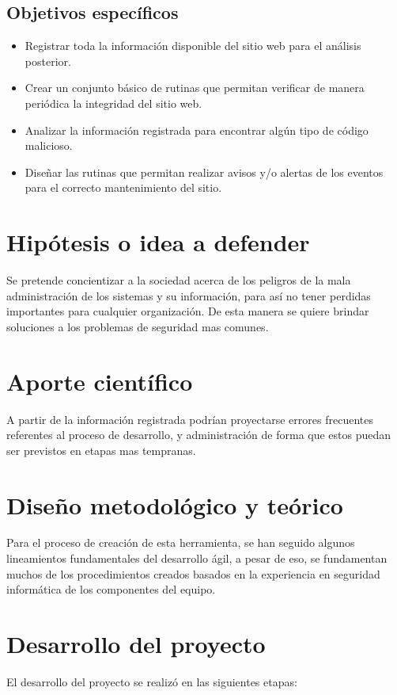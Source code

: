 \documentclass[letter,twoside,11pt]{article}
\begin{document}
\subsection{Objetivos específicos}
\begin{itemize}
\item Registrar toda la información disponible del sitio web para el análisis
    posterior.
\item Crear un conjunto básico de rutinas que permitan verificar de manera
    periódica la integridad del sitio web.
\item Analizar la información registrada para encontrar algún tipo de código
    malicioso.
\item Diseñar las rutinas que permitan realizar avisos y/o alertas de los
    eventos para el correcto mantenimiento del sitio.
\end{itemize}

\section{Hipótesis o idea a defender}
Se pretende concientizar a la sociedad acerca de los peligros de la mala
administración de los sistemas y su información, para así no tener perdidas
importantes para cualquier organización.
De esta manera se quiere brindar soluciones a los problemas de seguridad mas
comunes.

\section{Aporte científico}
A partir de la información registrada podrían proyectarse errores frecuentes
referentes al proceso de desarrollo, y administración de forma que estos puedan
ser previstos en etapas mas tempranas.

\section{Diseño metodológico y teórico}
Para el proceso de creación de esta herramienta, se han seguido algunos
lineamientos fundamentales del desarrollo ágil, a pesar de eso, se fundamentan
muchos de los procedimientos creados basados en la experiencia en seguridad
informática de los componentes del equipo.

\section{Desarrollo del proyecto}
El desarrollo del proyecto se realizó en las siguientes etapas:
\end{document}
